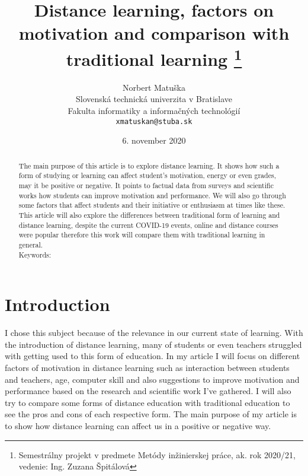 \documentclass[10pt,twoside,slovak,a4paper]{article}
\title{Distance learning, factors on motivation and comparison with
traditional learning \thanks{Semestrálny projekt v predmete Metódy inžinierskej práce, ak. rok 2020/21, vedenie: Ing. Zuzana Špitálová}}
\author{Norbert Matuška\\[2pt]
	{\small Slovenská technická univerzita v Bratislave}\\
	{\small Fakulta informatiky a informačných technológií}\\
	{\small \texttt{xmatuskan@stuba.sk}}
	}
\date{\small 6. november 2020}
\begin{document}
\maketitle

\begin{abstract}
The main purpose of this article is to explore distance learning. It shows how such a form of studying or learning can affect student's motivation, energy or even grades, may it be positive or negative. It points to factual data from surveys and scientific works how students can improve motivation and performance. We will also go through some factors that affect students and their initiative or enthusiasm at times like these. This article will also explore the differences between traditional form of learning and distance learning, despite the current COVID-19 events, online and distance courses were popular therefore this work will compare them with traditional learning in general.\\

Keywords:
\end{abstract}

\clearpage
\tableofcontents %
\clearpage
\section{Introduction}

I chose this subject because of the relevance in our current state of learning. With the introduction of distance learning, many of students or even teachers struggled with getting used to this form of education. In my article I will focus on different factors of motivation in distance learning such as interaction between students and teachers, age, computer skill and also suggestions to improve motivation and performance based on the research and scientific work I've gathered. I will also try to compare some forms of distance education with traditional education to see the pros and cons of each respective form. The main purpose of my article is to show how distance learning can affect us in a positive or negative way.
\end{document}
